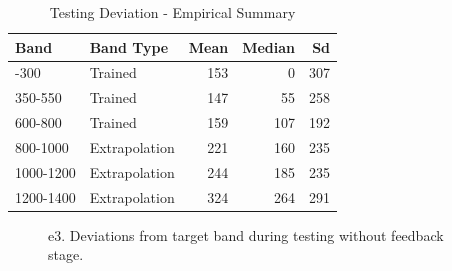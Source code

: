 \documentclass[
  letterpaper,
  DIV=11,
  numbers=noendperiod,
  oneside]{scrartcl}
\begin{document}
\begin{longtable}[]{@{}llrrr@{}}

\caption{\label{tbl-e3-test-nf-deviation}Testing Deviation - Empirical
Summary}

\tabularnewline

\toprule\noalign{}
Band & Band Type & Mean & Median & Sd \\
\midrule\noalign{}
\endhead
\bottomrule\noalign{}
\endlastfoot
100-300 & Trained & 153 & 0 & 307 \\
350-550 & Trained & 147 & 55 & 258 \\
600-800 & Trained & 159 & 107 & 192 \\
800-1000 & Extrapolation & 221 & 160 & 235 \\
1000-1200 & Extrapolation & 244 & 185 & 235 \\
1200-1400 & Extrapolation & 324 & 264 & 291 \\

\end{longtable}

\begin{figure}


\caption{\label{fig-e3-test-dev}e3. Deviations from target band during
testing without feedback stage.}

\end{figure}%
\end{document}
